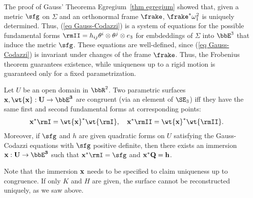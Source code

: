 The proof of Gauss' Theorema Egregium~\ref{thm egregium} showed that, given a metric $\sfg$ on $\Sigma$ and an orthonormal frame $\frake$, $\frake^\ast \omega_1^2$ is uniquely determined. Thus, (\ref{eq Gauss-Codazzi}) is a system of equations for the possible fundamental forms $\rmII=h_{ij}\theta^i\otimes \theta^j\otimes e_3$ for embdeddings of $\Sigma$ into $\bbE^3$ that induce the metric $\sfg$. These equations are well-defined, since (\ref{eq Gauss-Codazzi}) is invariant under changes of the frame $\frake$. Thus, the Frobenius theorem guarantees existence, while uniqueness up to a rigid motion is guaranteed only for a fixed parametrization.

\begin{thm}
    Let $U$ be an open domain in $\bbR^2$. Two parametric surfaces $\bf{x},\wt{\bf{x}}:U\to \bbE^3$ are congruent (via an element of $\SE_3$) iff they have the same first and second fundamental forms at corresponding points:
    \[\bf{x}^\ast\rmI=\wt{\bf{x}}^\ast \wt{\rmI},\quad \bf{x}^\ast\rmII=\wt{\bf{x}}^\ast \wt{\rmII}.\] 
    Moreover, if $\sfg$ and $h$ are given quadratic forms on $U$ satisfying the Gauss-Codazzi equations with $\sfg$ positive definite, then there exists an immersion $\bf{x}:U\to \bbE^3$ such that $\bf{x}^\ast  \rmI=\sfg$ and $\bf{x}^\ast  Q=h$.
\end{thm}
Note that the immersion $\bf{x}$ needs to be specified to claim uniqueness up to congruence. If only $K$ and $H$ are given, the surface cannot be reconstructed uniquely, as we saw above.
